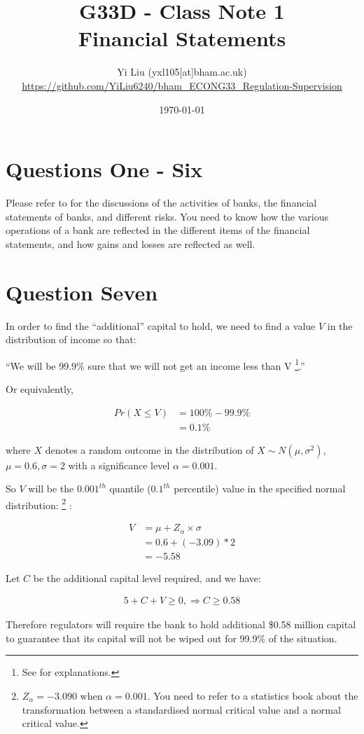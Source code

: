 \documentclass[12pt]{article}
\author{Yi Liu (yxl105[at]bham.ac.uk)\\\scriptsize{\url{https://github.com/YiLiu6240/bham_ECONG33_Regulation-Supervision}}}
\date{\today}
\title{G33D - Class Note 1\\Financial Statements}
\begin{document}
\maketitle

\section*{Questions One - Six}

Please refer to \citet[Chap.2]{hull2012risk} for the discussions of the
activities of banks, the financial statements of banks, and different risks. You
need to know how the various operations of a bank are reflected in the different
items of the financial statements, and how gains and losses are reflected as
well.

\section*{Question Seven}

In order to find the ``additional'' capital to hold, we need to find a value
\(V\) in the distribution of income so that:

``We will be 99.9\% sure that we will not get an income less than V%
\footnote{See \citet[Chap.9, pp.183-185]{hull2012risk} for explanations.}.''

Or equivalently,

\begin{align*}
  Pr(X \leq V) & = 100\% - 99.9\% \\
               & = 0.1\%
\end{align*}

where \(X\) denotes a random outcome in the distribution of \(X \sim N(\mu,
\sigma^2)\), \(\mu = 0.6, \sigma = 2\) with a significance level \(\alpha =
0.001\).

So \(V\) will be the \(0.001^{th}\) quantile (\(0.1^{th}\) percentile) value in
the specified normal distribution:%
\footnote{ \(Z_{\alpha} = -3.090\) when \(\alpha = 0.001\). You need to refer to
  a statistics book about the transformation between a standardised normal
  critical value and a normal critical value.}%
:

\begin{align*}
  V & = \mu + Z_{\alpha} \times \sigma \\
    & = 0.6 + (- 3.09)*2 \\
    & = -5.58
\end{align*}

Let \(C\) be the additional capital level required, and we have:

\begin{align*}
  5 + C + V \geq 0, \Rightarrow C \geq 0.58
\end{align*}

Therefore regulators will require the bank to hold additional \$0.58 million
capital to guarantee that its capital will not be wiped out for 99.9\% of the
situation.

 
\end{document}
